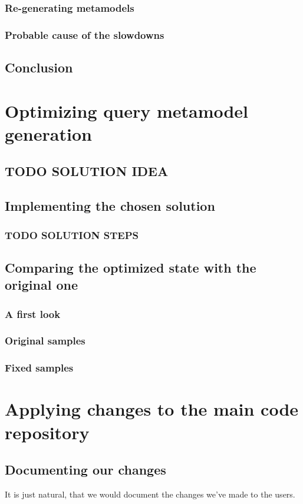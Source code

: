 \documentclass[11pt,a4paper,oneside]{report}
\begin{document}
\subsection{Re-generating metamodels}
\subsection{Probable cause of the slowdowns}
\section{Conclusion}

\chapter{Optimizing query metamodel generation}
\section{TODO SOLUTION IDEA}
\section{Implementing the chosen solution}
\subsection{TODO SOLUTION STEPS}
\section{Comparing the optimized state with the original one}
\subsection{A first look}
\subsection{Original samples}
\subsection{Fixed samples}

\chapter{Applying changes to the main code repository}
\section{Documenting our changes}
It is just natural, that we would document the changes we've made to the users.
\end{document}
